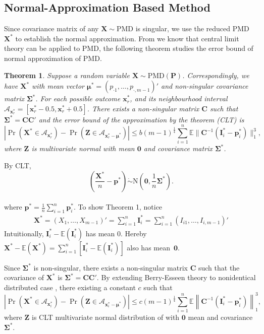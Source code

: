 \documentclass[12pt]{article}
\newcommand{\zerovec}{{\boldsymbol{0}}}
\newcommand{\Ivec}{{\boldsymbol{I}}}
\newcommand{\EE}{\mathbb{E}}
\newcommand{\Cmat}{\mathbf{C}}
\newcommand{\Pmat}{\mathbf{P}}
\newcommand{\pvec}{\boldsymbol{p}}
\newcommand{\N}{\textrm{N}}
\newcommand{\PMD}{\textrm{PMD}}
\newcommand{\Xvec}{\boldsymbol{X}}
\newcommand{\Zvec}{\boldsymbol{Z}}
\newcommand{\xvec}{\boldsymbol{x}}
\newcommand{\muvec}{\boldsymbol{\mu}}
\newcommand{\Sig}{\boldsymbol{\Sigma}}
\newcommand{\mvec}{\boldsymbol{\mu}}
\newtheorem{thm}{Theorem}
\begin{document}
\subsection{Normal-Approximation Based Method}
Since covariance matrix of any $\Xvec \sim \PMD$ is singular, we use the reduced $\PMD$ $\Xvec^{\ast}$ to establish the normal approximation. From   we know that central limit theory can be applied to $\PMD$, the following theorem studies the error bound of normal approximation of $\PMD$.
\begin{thm}
Suppose a random variable $\Xvec \sim \PMD(\Pmat)$. Correspondingly, we have $\Xvec^{\ast}$ with mean vector $\mvec^{\ast} = \left( p_{\cdot1} ,\dots,p_{\cdot,m-1}\right)'$ and non-singular covariance matrix $\Sig^{\ast}$. For each possible outcome $\xvec_r^{\ast}$, and its neighbourhood interval $\mathcal{A}_{\xvec_r^{\ast}} = [\xvec_r^{\ast}-0.5, \xvec_r^{\ast}+0.5]$. There exists a non-singular matrix $\Cmat$ such that $\Sig^{\ast} = \Cmat\Cmat'$ and the error bound of the approximation by the theorem (CLT) is
\begin{equation*}
    |\Pr(\Xvec^{\ast} \in \mathcal{A}_{\xvec_r^{\ast}}) - \Pr(\Zvec \in \mathcal{A}_{\xvec_r^{\ast}-\mvec^{\ast}})| \leq b (m-1)^{\frac{1}{4}} \sum_{i=1}^{n}\EE\|\Cmat^{-1}(\Ivec_{i}^{\ast}-\pvec_{i}^{\ast})\|_1^3,
\end{equation*}
where $\Zvec$ is multivariate normal with mean $\zerovec$ and covariance matrix $\Sig^{\ast}$.
\end{thm}
By CLT,
$$\left(\frac{\Xvec^{\ast}}{n}-\pvec^{\ast}\right)\dot\sim \N\left(\zerovec, \frac{1}{n}\Sig^{\ast}\right).$$\\
where $\pvec^{\ast} = \frac{1}{n}\sum_{i=1}^{n}\pvec_i^{\ast}$.
To show Theorem 1, notice
\begin{align*}
    \Xvec^{\ast} = (X_1,\dots,X_{m-1})' = \sum_{i=1}^{n} \Ivec_{i}^{\ast}= \sum_{i=1}^{n} (I_{i1},\dots,I_{i,m-1})'
\end{align*}
Intuitionally, $\Ivec_i^{\ast} - \EE(\Ivec_i^{\ast})$ has mean 0. Hereby $\Xvec^{\ast} - \EE (\Xvec^{\ast}) = \sum_{i=1}^{n} [\Ivec_i^{\ast} - \EE (\Ivec_{i}^{\ast})]$ also has mean~$\zerovec$.

Since $\Sig^{\ast}$ is non-singular, there exists a non-singular matrix $\Cmat$ such that the covariance of $\Xvec^{\ast}$ is $\Sig^{\ast} = \Cmat\Cmat'$. By extending Berry-Esseen theory to nonidentical distributed case \cite{article}, there existing  a constant $c$ such that
\begin{equation*}
    |\Pr\left(\Xvec^{\ast} \in \mathcal{A}_{\xvec_i^{\ast}}\right) - \Pr\left(\Zvec \in \mathcal{A}_{\xvec_i^{\ast}-\muvec^{\ast}} \right)| \leq c(m-1)^{\frac{1}{4}}\sum_{i=1}^{n} \EE \left\|\Cmat^{-1}(\Ivec_{i}^{\ast}-\pvec_{i}^{\ast})\right\|_1^3,
\end{equation*}
where $\Zvec$ is CLT multivariate normal distribution of with $\zerovec$ mean and covariance $\Sig^{\ast}$.
\end{document}
